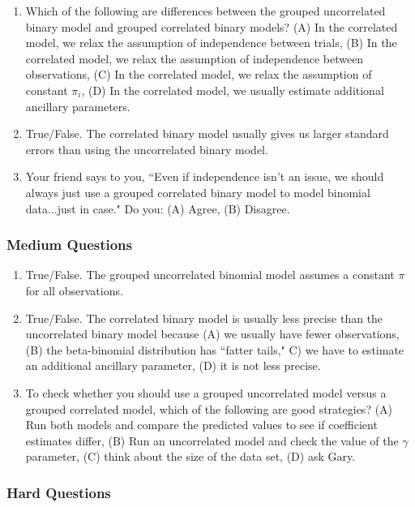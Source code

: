 \documentclass[11pt]{article}
\begin{document}
\begin{enumerate}
\item Which of the following are differences between the grouped uncorrelated binary model and grouped correlated binary models? (A) In the correlated model, we relax the assumption of independence between trials, (B) In the correlated model, we relax the assumption of independence between observations, (C) In the correlated model, we relax the assumption of constant $\pi_i$, (D) In the correlated model, we usually estimate additional ancillary parameters.
\item True/False. The correlated binary model usually gives us larger standard errors than using the uncorrelated binary model.
\item Your friend says to you, ``Even if independence isn't an issue, we should always just use a grouped correlated binary model to model binomial data...just in case."  Do you: (A) Agree, (B) Disagree.
\end{enumerate}

\subsubsection{Medium Questions}

\begin{enumerate}
\item True/False. The grouped uncorrelated binomial model assumes a constant $\pi$ for all observations.
\item True/False.  The correlated binary model is usually less precise than the uncorrelated binary model because (A) we usually have fewer observations, (B) the beta-binomial distribution has ``fatter tails," C) we have to estimate an additional ancillary parameter, (D) it is not less precise.
\item To check whether you should use a grouped uncorrelated model versus a grouped correlated model, which of the following are good strategies? (A) Run both models and compare the predicted values to see if coefficient estimates differ, (B) Run an uncorrelated model and check the value of the $\gamma$ parameter, (C) think about the size of the data set, (D) ask Gary.
\end{enumerate}

\subsubsection{Hard Questions}
\end{document}
